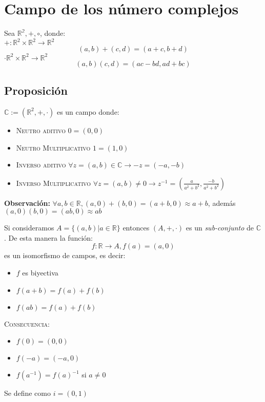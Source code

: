 \section{Campo de los número complejos}
Sea $\mathbb{R^2}, +, \circ$, donde:\\
$+ : \mathbb{R}^2 \times \mathbb{R}^2 \rightarrow \mathbb{R}^2$
\[
  (a,b)+(c,d)=(a+c, b+d)
\]
$\cdot \mathbb{R}^2 \times \mathbb{R}^2 \rightarrow \mathbb{R}^2$
\[
  (a,b) (c,d) = (ac-bd, ad+bc)
\]

\subsection{Proposición}
$\mathbb{C}:= (\mathbb{R}^2,+,\cdot)$ es un campo donde:
\begin{itemize}
  \item \textsc{Neutro aditivo} $0 = (0,0)$
  \item \textsc{Neutro Multiplicativo} $1 = (1,0)$
  \item \textsc{Inverso aditivo} $\forall z = (a,b) \in \mathbb{C} \rightarrow -z = (-a, -b)$
  \item \textsc{Inverso Multiplicativo} $\forall z = (a,b)\neq 0 \rightarrow z^{-1} = \left( \displaystyle\frac{a}{a^2 +b^2}, \displaystyle\frac{-b}{a^2 +b^2} \right)$
\end{itemize}

\textbf{Observación:} $\forall a,b \in \mathbb{R}, (a,0)+(b,0)=(a+b,0) \approx a+b$,
además $(a,0)(b,0)=(ab,0) \approx ab$

Si consideramos $A=\{ (a,b)| a\in \mathbb{R} \}$ entonces $(A,+,\cdot)$ es un \textit{sub-conjunto} de $\mathbb{C}$. De esta manera la función:
\[
  f:\mathbb{R}\rightarrow A, f(a)= (a,0)
\]
es un isomorfismo de campos, es decir:
\begin{itemize}
  \item $f$ es biyectiva
  \item $f(a+b)=f(a)+f(b)$
  \item $f(ab)=f(a)+f(b)$
\end{itemize}

\textsc{Consecuencia:}
\begin{itemize}
  \item $f(0) = (0,0)$
  \item $f(-a) = (-a,0)$
  \item $f(a^{-1}) = f(a)^{-1}$ si $a \neq 0$
\end{itemize}

\begin{definition}
  Se define como $i=(0,1)$
\end{definition}

